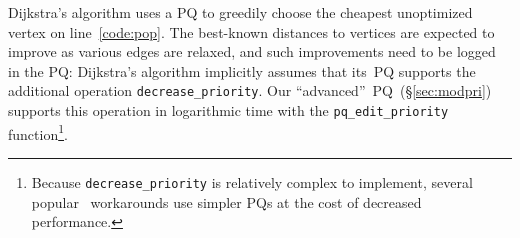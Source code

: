 
Dijkstra's algorithm uses a PQ to greedily choose the 
cheapest unoptimized vertex on line~\ref{code:pop}. The 
best-known distances to vertices are expected to improve as 
various edges are relaxed, and such improvements need to be logged in the PQ:
Dijkstra's algorithm implicitly assumes that its~PQ supports the additional
operation \texttt{decrease\_priority}.
Our ``advanced''~PQ~(\S\ref{sec:modpri})
supports this operation in logarithmic time with the 
\texttt{pq\_edit\_priority} function\footnote{Because
\texttt{decrease\_priority} is relatively complex to implement,
several popular~\cite{blah,blah,blah} 
workarounds use simpler PQs at the cost
of decreased performance.}.


